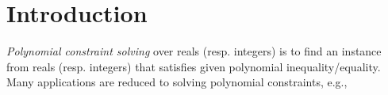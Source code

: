 \documentclass[runningheads,a4paper,oribibl]{llncs}
\begin{document}
%

\section{Introduction}
{\em Polynomial constraint solving} over reals (resp. integers) is to find an instance from reals
(resp. integers) that satisfies given polynomial inequality/equality. 
%
Many applications are reduced to solving polynomial constraints, e.g.,
\end{document}
